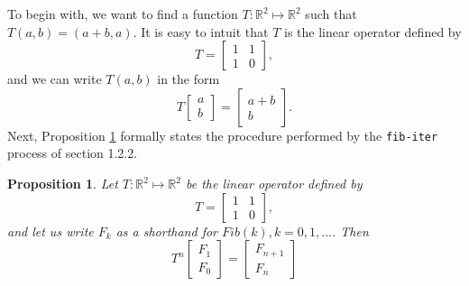 \documentclass{article}
\newtheorem{proposition}{Proposition}
\begin{document}
\noindent To begin with, we want to find a function
$T: \mathbb{R}^2 \mapsto \mathbb{R}^2$ such that $T(a, b) = (a + b, a)$.  It is
easy to intuit that $T$ is the linear operator defined by
\begin{equation*}
  T =
  \begin{bmatrix}
    1 & 1 \\
    1 & 0
  \end{bmatrix},
\end{equation*}
and we can write $T(a, b)$ in the form
\begin{equation*}
  T
  \begin{bmatrix}
    a \\
    b
  \end{bmatrix}
  =
  \begin{bmatrix}
    a + b \\
    b
  \end{bmatrix}.
\end{equation*}
Next, Proposition \ref{fast-iter-proof} formally states the procedure performed
by the \lstinline{fib-iter} process of section 1.2.2.





\vspace{10mm}
\begin{proposition}
  \label{fast-iter-proof}
  Let $T: \mathbb{R}^2 \mapsto \mathbb{R}^2$ be the linear operator defined by
  \begin{equation*}
    T =
    \begin{bmatrix}
      1 & 1 \\
      1 & 0
    \end{bmatrix},
  \end{equation*}
  and let us write $F_k$ as a shorthand for $\mathit{Fib}(k), k = 0, 1, \dots$.
  Then
  \begin{equation*}
    T^n
    \begin{bmatrix}
      F_1 \\
      F_0
    \end{bmatrix}
    =
    \begin{bmatrix}
      F_{n + 1} \\
      F_n
    \end{bmatrix}
  \end{equation*}
\end{proposition}
\end{document}
